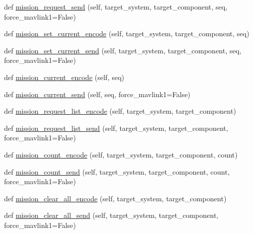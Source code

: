 \begin{DoxyCompactItemize}
\item 
def \hyperlink{classpymavlink_1_1dialects_1_1v10_1_1MAVLink_a7ae2f3f4e4da6147c69c492498db73e7}{mission\+\_\+request\+\_\+send} (self, target\+\_\+system, target\+\_\+component, seq, force\+\_\+mavlink1=False)
\item 
def \hyperlink{classpymavlink_1_1dialects_1_1v10_1_1MAVLink_a9ec01aa0983ffb918c872ac6bcdf8658}{mission\+\_\+set\+\_\+current\+\_\+encode} (self, target\+\_\+system, target\+\_\+component, seq)
\item 
def \hyperlink{classpymavlink_1_1dialects_1_1v10_1_1MAVLink_a45a01e196f1b2a1d9d10b2ae33b4e104}{mission\+\_\+set\+\_\+current\+\_\+send} (self, target\+\_\+system, target\+\_\+component, seq, force\+\_\+mavlink1=False)
\item 
def \hyperlink{classpymavlink_1_1dialects_1_1v10_1_1MAVLink_a15c4a5182806371bf3946a68fe95b149}{mission\+\_\+current\+\_\+encode} (self, seq)
\item 
def \hyperlink{classpymavlink_1_1dialects_1_1v10_1_1MAVLink_a2bcfb35e1e3120b29eab5e1f7aedf674}{mission\+\_\+current\+\_\+send} (self, seq, force\+\_\+mavlink1=False)
\item 
def \hyperlink{classpymavlink_1_1dialects_1_1v10_1_1MAVLink_aec3dae7c3533513fe591e49e7a670ec6}{mission\+\_\+request\+\_\+list\+\_\+encode} (self, target\+\_\+system, target\+\_\+component)
\item 
def \hyperlink{classpymavlink_1_1dialects_1_1v10_1_1MAVLink_ac8fc64924ff0edcf069ce6aa224b6493}{mission\+\_\+request\+\_\+list\+\_\+send} (self, target\+\_\+system, target\+\_\+component, force\+\_\+mavlink1=False)
\item 
def \hyperlink{classpymavlink_1_1dialects_1_1v10_1_1MAVLink_a9bcb9048d381e0c38916eed316640206}{mission\+\_\+count\+\_\+encode} (self, target\+\_\+system, target\+\_\+component, count)
\item 
def \hyperlink{classpymavlink_1_1dialects_1_1v10_1_1MAVLink_ad32fea844a012afa51e3f49c991c39ea}{mission\+\_\+count\+\_\+send} (self, target\+\_\+system, target\+\_\+component, count, force\+\_\+mavlink1=False)
\item 
def \hyperlink{classpymavlink_1_1dialects_1_1v10_1_1MAVLink_a3230a1acefe608aeee0b8d4495e2bd00}{mission\+\_\+clear\+\_\+all\+\_\+encode} (self, target\+\_\+system, target\+\_\+component)
\item 
def \hyperlink{classpymavlink_1_1dialects_1_1v10_1_1MAVLink_a3843d012758fab2f9a8283b60f5962bb}{mission\+\_\+clear\+\_\+all\+\_\+send} (self, target\+\_\+system, target\+\_\+component, force\+\_\+mavlink1=False)

\end{DoxyCompactItemize}
